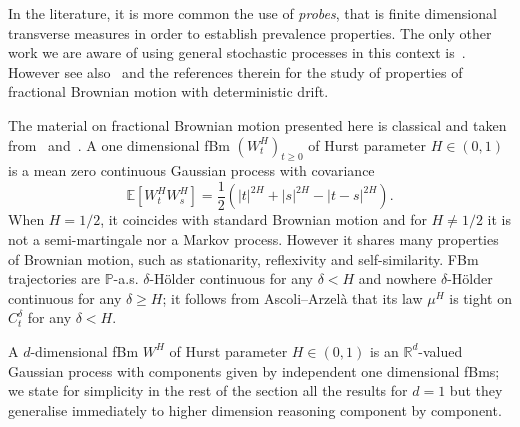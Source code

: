 \documentclass[10pt]{article}
\newcommand{\tmtextit}[1]{{\itshape{#1}}}
\begin{document}
In the literature, it is more common the use of \tmtextit{probes}, that is
finite dimensional transverse measures in order to establish prevalence
properties. The only other work we are aware of using general stochastic
processes in this context is~{\cite{bayart}}. However see also~{\cite{peres}}
and the references therein for the study of properties of fractional Brownian
motion with deterministic drift.
\

The material on fractional Brownian motion presented here is classical and
taken from~{\cite{nualart2006}} and~{\cite{picard}}. A one dimensional fBm
$(W^H_t)_{t \geqslant 0}$ of Hurst parameter $H \in (0, 1)$ is a mean zero
continuous Gaussian process with covariance
\[ \mathbb{E} [W^H_t W^H_s] = \frac{1}{2} (| t |^{2 H} + | s |^{2 H} - | t - s
   |^{2 H}) . \]
When $H = 1 / 2$, it coincides with standard Brownian motion and for $H \neq 1
/ 2$ it is not a semi-martingale nor a Markov process. However it shares many
properties of Brownian motion, such as stationarity, reflexivity and
self-similarity. FBm trajectories are $\mathbb{P}$-a.s. $\delta$-H{\"o}lder
continuous for any $\delta < H$ and nowhere $\delta$\mbox{-}H{\"o}lder
continuous for any $\delta \geqslant H$; it follows from Ascoli--Arzel{\`a}
that its law $\mu^H$ is tight on $C^{\delta}_t$ for any $\delta < H$.

A $d$\mbox{-}dimensional fBm $W^H$ of Hurst parameter $H \in (0, 1)$ is an
$\mathbb{R}^d$\mbox{-}valued Gaussian process with components given by
independent one dimensional fBms; we state for simplicity in the rest of the
section all the results for $d = 1$ but they generalise immediately to higher
dimension reasoning component by component.
\end{document}
